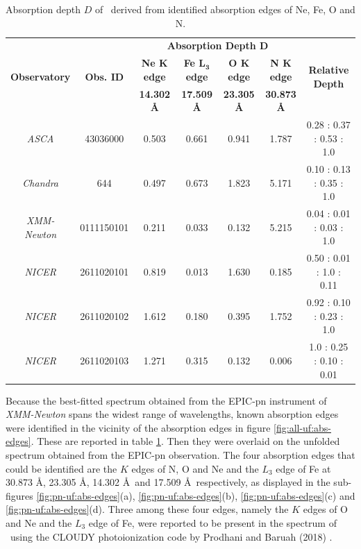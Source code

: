     \begin{table}[!htb]
    	\centering
    	\caption{Absorption depth $D$ of \source\ derived from identified absorption edges of Ne, Fe, O and N.}
    	\label{tab:abs-depth}
		\begin{tabular}{ccccccc}
			\hline
			\multirow{3}{*}{\textbf{Observatory}} & \multirow{3}{*}{\textbf{Obs. ID}} & \multicolumn{4}{c}{\textbf{Absorption Depth $\boldsymbol{D}$}} & \multirow{3}{*}{\textbf{Relative Depth}} \\ \cline{3-6} & & \textbf{Ne $\boldsymbol{K}$ edge} & \textbf{Fe $\boldsymbol{L_3}$ edge} & \textbf{O $\boldsymbol{K}$ edge} & \textbf{N $\boldsymbol{K}$ edge} \\ \cline{3-6} & & \textbf{14.302 \AA} & \textbf{17.509 \AA} & \textbf{23.305 \AA} & \textbf{30.873 \AA} \\
			\hline
			{\textit{ASCA}} & {43036000} & {0.503} & {0.661} & {0.941} & {1.787} & {0.28 : 0.37 : 0.53 : 1.0} \\ %
			{\textit{Chandra}} & {644} & {0.497} & {0.673} & {1.823} & {5.171} & {0.10 : 0.13 : 0.35 : 1.0} \\ %
			{\textit{XMM-Newton}} & {0111150101} & {0.211} & {0.033} & {0.132} & {5.215} & {0.04 : 0.01 : 0.03 : 1.0} \\ %
			{\textit{NICER}} & {2611020101} & {0.819} & {0.013} & {1.630} & {0.185} & {0.50 : 0.01 : 1.0 : 0.11} \\ %
			{\textit{NICER}} & {2611020102} & {1.612} & {0.180} & {0.395} & {1.752} & {0.92 : 0.10 : 0.23 : 1.0} \\ %
			{\textit{NICER}} & {2611020103} & {1.271} & {0.315} & {0.132} & {0.006} & {1.0 : 0.25 : 0.10 : 0.01} \\ %
			\hline
		\end{tabular}
	\end{table}

    Because the best-fitted spectrum obtained from the EPIC-pn instrument of \textit{XMM-Newton} spans the widest range of wavelengths, known absorption edges \cite{bearden1967reevaluation,juett2006high} were identified in the vicinity of the absorption edges in figure \ref{fig:all-uf:abs-edges}. These are reported in table \ref{tab:abs-depth}. Then they were overlaid on the unfolded spectrum obtained from the EPIC-pn observation. The four absorption edges that could be identified are the $K$ edges of N, O and Ne and the $L_3$ edge of Fe at 30.873 \AA, 23.305 \AA, 14.302 \AA\ and 17.509 \AA\ respectively, as displayed in the sub-figures \ref{fig:pn-uf:abs-edges}(a), \ref{fig:pn-uf:abs-edges}(b), \ref{fig:pn-uf:abs-edges}(c) and \ref{fig:pn-uf:abs-edges}(d). Three among these four edges, namely the $K$ edges of O and Ne and the $L_3$ edge of Fe, were reported to be present in the spectrum of \source\ using the CLOUDY photoionization code by Prodhani and Baruah (2018) \cite{prodhani2018galactic}.
    
